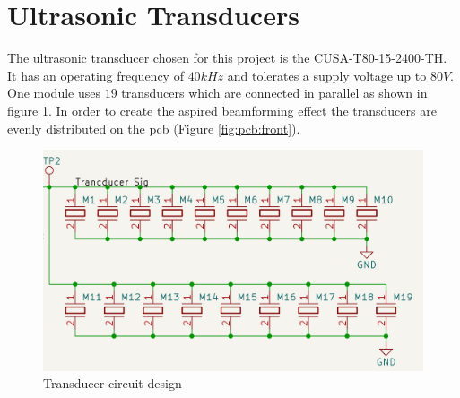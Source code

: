 \section{Ultrasonic Transducers}

The ultrasonic transducer chosen for this project is the CUSA-T80-15-2400-TH. It has an operating frequency of $40kHz$ and tolerates a supply voltage up to $80V$.\cite{cui_devices_cusa-t80-15-2400-th_2020}\p
One module uses $19$ transducers which are connected in parallel as shown in figure \ref{fig:pcb:transducer_circuit}. In order to create the aspired beamforming effect the transducers are evenly distributed on the pcb (Figure \ref{fig:pcb:front}).
%
\begin{figure}
  \centering
  \includegraphics[height=\mediumheight]{src/assets/pictures/circuit/transducer_circuit.png}
  \caption{Transducer circuit design}\label{fig:pcb:transducer_circuit}
\end{figure}